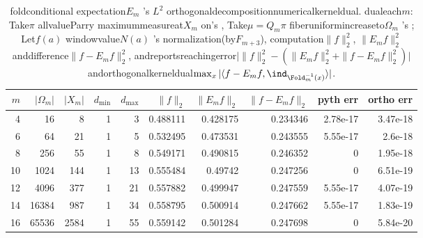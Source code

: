 \begin{table}[H]
\centering
\scriptsize
\setlength{\tabcolsep}{4pt}
\caption{foldconditional expectation$E_m$ 's  $L^2$ orthogonaldecompositionnumericalkerneldual. dualeach$m$: Take$\pi$ allvalueParry maximummeasureat$X_m$ on's , Take$\mu=Q_m\pi$ fiberuniformincreaseto$\Omega_m$ 's ; Let$f(a)$ windowvalue$N(a)$ 's normalization(by$F_{m+3}$), computation$\|f\|_2^2$, $\|E_m f\|_2^2$ anddifference$\|f-E_m f\|_2^2$, andreportsreachingerror$\bigl|\|f\|_2^2-(\|E_m f\|_2^2+\|f-E_m f\|_2^2)\bigr|$ andorthogonalkerneldual$\max_x|\langle f-E_m f,\ind_{\Fold_m^{-1}(x)}\rangle|$. }
\label{tab:fold_conditional_expectation_pythagoras}
\begin{tabular}{rrrrrrrrrr}
\toprule
$m$ & $|\Omega_m|$ & $|X_m|$ & $d_{\min}$ & $d_{\max}$ & $\|f\|_2$ & $\|E_m f\|_2$ & $\|f-E_m f\|_2$ & pyth err & ortho err\\
\midrule
4 & 16 & 8 & 1 & 3 & 0.488111 & 0.428175 & 0.234346 & 2.78e-17 & 3.47e-18\\
6 & 64 & 21 & 1 & 5 & 0.532495 & 0.473531 & 0.243555 & 5.55e-17 & 2.6e-18\\
8 & 256 & 55 & 1 & 8 & 0.549171 & 0.490815 & 0.246352 & 0 & 1.95e-18\\
10 & 1024 & 144 & 1 & 13 & 0.555484 & 0.49742 & 0.247256 & 0 & 6.51e-19\\
12 & 4096 & 377 & 1 & 21 & 0.557882 & 0.499947 & 0.247559 & 5.55e-17 & 4.07e-19\\
14 & 16384 & 987 & 1 & 34 & 0.558795 & 0.500914 & 0.247662 & 5.55e-17 & 1.83e-19\\
16 & 65536 & 2584 & 1 & 55 & 0.559142 & 0.501284 & 0.247698 & 0 & 5.84e-20\\
\bottomrule
\end{tabular}
\end{table}
